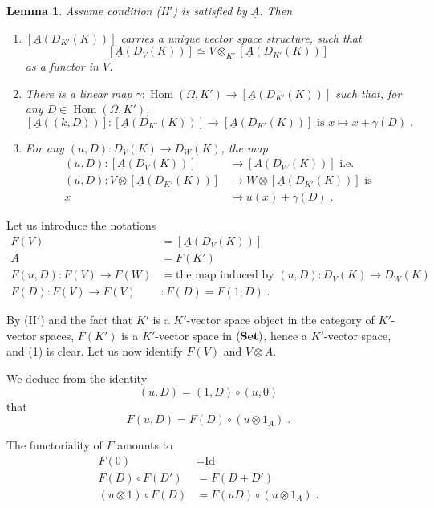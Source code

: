 \documentclass[11pt]{article}
\theoremstyle{plain}
\newtheorem{lemma}[theorem]{Lemma}
\theoremstyle{definition}
\theoremstyle{remark}
\DeclareMathOperator{\Hom}{Hom}
\newcommand{\uA}{\underline{A}}\newcommand{\uH}{\underline{H}}\newcommand{\uExt}{\underline{\operatorname{Ext}}}\newcommand{\uL}{\underline{L}}\newcommand{\uM}{\underline{M}}\newcommand{\uZ}{\underline{Z}}\newcommand{\uB}{\underline{B}}\newcommand{\uC}{\underline{C}}\newcommand{\uD}{\underline{D}}\newcommand{\uE}{\underline{E}}\newcommand{\uG}{\underline{G}}\newcommand{\uP}{\underline{P}}\newcommand{\uQ}{\underline{Q}}
\begin{document}
\begin{lemma}
Assume condition \textup{(II$'$)} is satisfied by $\uA$. Then
\begin{enumerate}
\item[(1)] $[\uA(D_{K'}(K))]$ carries a unique vector space structure, such that
\[
[\uA(D_V(K))] \simeq V \otimes_{K'} [\uA(D_{K'}(K))]
\]
as a functor in $V$.

\item[(2)] There is a linear map $\gamma : \Hom(\Omega, K') \to [\uA(D_{K'}(K))]$ such that, for any $D \in \Hom(\Omega, K')$,
\[
[\uA((k,D))] : [\uA(D_{K'}(K))] \longrightarrow [\uA(D_{K'}(K))] \text{ is } x \longmapsto x + \gamma(D)\;.
\]

\item[(3)] For any $(u,D) : D_V(K) \longrightarrow D_W(K)$, the map
\begin{align*}
(u,D) : [\uA(D_V(K))] &\longrightarrow [\uA(D_W(K))] \text{ i.e.} \\
(u,D) : V \otimes [\uA(D_{K'}(K))] &\longrightarrow W \otimes [\uA(D_{K'}(K))] \text{ is} \\
x &\longmapsto u(x) + \gamma(D)\;.
\end{align*}
\end{enumerate}
\end{lemma}

Let us introduce the notations
\begin{align*}
F(V) &= [\uA(D_V(K))] \\
A &= F(K') \\
F(u,D) : F(V) \to F(W) &= \text{the map induced by } (u,D) : D_V(K) \to D_W(K) \\
F(D) : F(V) \to F(V) &: F(D) = F(1,D)\;.
\end{align*}

By (II$'$) and the fact that $K'$ is a $K'$-vector space object in the category of $K'$-vector spaces, $F(K')$ is a $K'$-vector space in $(\mathbf{Set})$, hence a $K'$-vector space, and (1) is clear. Let us now identify $F(V)$ and $V \otimes A$.

We deduce from the identity
\[
(u,D) = (1,D) \circ (u,0)
\]
that
\[
F(u,D) = F(D) \circ (u \otimes 1_A)\;.
\]

The functoriality of $F$ amounts to
\begin{align*}
F(0) &= \text{Id} \\
F(D) \circ F(D') &= F(D + D') \\
(u \otimes 1) \circ F(D) &= F(uD) \circ (u \otimes 1_A)\;.
\end{align*}
\end{document}
